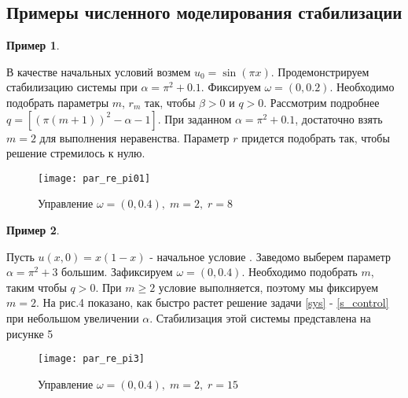 \subsection{Примеры численного моделирования стабилизации}

\vspace{1em}

\newtheorem{exmp_st}{Пример}

\begin{exmp_st}
\end{exmp_st}

В качестве начальных условий возмем $u_0 = \sin(\pi x)$. Продемонстрируем 
стабилизацию системы при $\alpha = \pi^2 + 0.1$. Фиксируем $\omega = (0, 0.2)$. 
Необходимо подобрать параметры $m$, $r_m$ так, чтобы $\beta > 0$ и $q > 0$. 
Рассмотрим подробнее $q = [(\pi(m + 1))^2 - \alpha - 1]$. При заданном 
$\alpha = \pi^2 + 0.1$, достаточно взять $m = 2$ для выполнения неравенства. 
Параметр $r$ придется подобрать так, чтобы решение стремилось к нулю.


\begin{figure}[H]
    \centering
    \texttt{[image: par\_re\_pi01]}
    \caption{Управление $\omega = (0, 0.4),\; m = 2,\; r = 8$}
    \label{fig:test2}
\end{figure}

\begin{exmp_st}
\end{exmp_st}

Пусть $u(x, 0) = x(1 - x)$ - начальное условие . Заведомо выберем параметр 
$\alpha = \pi^2 + 3$ большим. Зафиксируем $\omega = (0, 0.4)$. 
Необходимо подобрать $m$, таким чтобы $q > 0$. При $m \ge 2$ условие выполняется, 
поэтому мы фиксируем $m = 2$. На рис.4 показано, как быстро растет решение 
задачи \eqref{sys} - \eqref{s_control} при небольшом увеличении $\alpha$. 
Стабилизация этой системы представлена на рисунке 5

\begin{figure}[H]
    \centering
    \texttt{[image: par\_re\_pi3]}
    \caption{Управление $\omega = (0, 0.4),\; m = 2,\; r = 15$}
    \label{fig:test2}
\end{figure}
